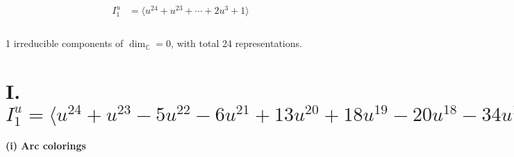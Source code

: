 \documentclass[1p]{elsarticle_modified}
\theoremstyle{definition}
\begin{document}
\begin{align*}
I^u_{1}&=\langle 
u^{24}+u^{23}+\cdots+2 u^3+1\rangle \\
\\
\end{align*}
\raggedright * 1 irreducible components of $\dim_{\mathbb{C}}=0$, with total 24 representations.\\
\newpage
\renewcommand{\arraystretch}{1}
\centering \section*{I. $I^u_{1}= \langle u^{24}+u^{23}-5 u^{22}-6 u^{21}+13 u^{20}+18 u^{19}-20 u^{18}-34 u^{17}+19 u^{16}+44 u^{15}-10 u^{14}-42 u^{13}+2 u^{12}+32 u^{11}-22 u^9+13 u^7+u^6-6 u^5- u^4+2 u^3+1 \rangle$}
\flushleft \textbf{(i) Arc colorings}\\
\end{document}
